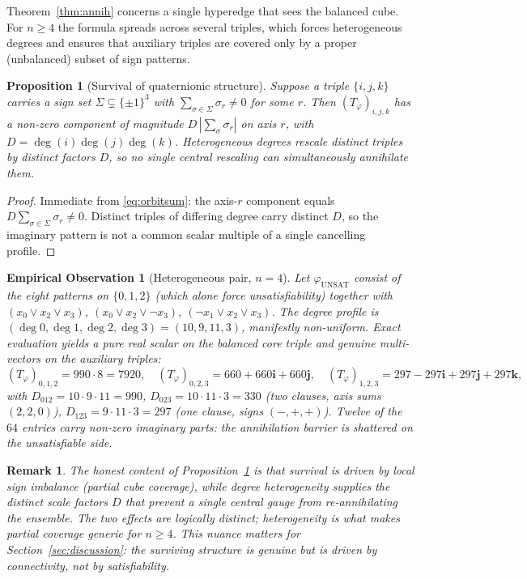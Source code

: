 \documentclass[pdflatex,sn-mathphys-num]{sn-jnl}
\theoremstyle{thmstyleone}%
\newtheorem{proposition}[theorem]{Proposition}%
\theoremstyle{thmstyletwo}%
\newtheorem{remark}{Remark}%
\newtheorem{observation}[theorem]{Empirical Observation}%
\theoremstyle{thmstylethree}%
\newcommand{\bi}{\mathbf{i}}
\newcommand{\bj}{\mathbf{j}}
\newcommand{\bk}{\mathbf{k}}
\newcommand{\Tphi}{T_{\varphi}}
\DeclareMathOperator{\deggr}{deg}
\begin{document}
Theorem~\ref{thm:annih} concerns a single hyperedge that sees the balanced
cube. For $n\ge4$ the formula spreads across several triples, which forces
heterogeneous degrees and ensures that auxiliary triples are covered only
by a proper (unbalanced) subset of sign patterns.

\begin{proposition}[Survival of quaternionic structure]\label{prop:survive}
Suppose a triple $\{i,j,k\}$ carries a sign set
$\Sigma\subsetneq\{\pm1\}^3$ with $\sum_{\sigma\in\Sigma}\sigma_r\neq0$ for
some $r$. Then $(\Tphi)_{i,j,k}$ has a non-zero component of magnitude
$D\,|\sum_\sigma\sigma_r|$ on axis $r$, with
$D=\deggr(i)\deggr(j)\deggr(k)$. Heterogeneous degrees rescale distinct
triples by distinct factors $D$, so no single central rescaling can
simultaneously annihilate them.
\end{proposition}

\begin{proof}
Immediate from \eqref{eq:orbitsum}: the axis-$r$ component equals
$D\sum_{\sigma\in\Sigma}\sigma_r\neq0$. Distinct triples of differing
degree carry distinct $D$, so the imaginary pattern is not a common scalar
multiple of a single cancelling profile.
\end{proof}

\begin{observation}[Heterogeneous pair, $n=4$]\label{obs:n4}
Let $\varphi_{\mathrm{UNSAT}}$ consist of the eight patterns on
$\{0,1,2\}$ (which alone force unsatisfiability) together with
$(x_0\vee x_2\vee x_3)$, $(x_0\vee x_2\vee\lnot x_3)$,
$(\lnot x_1\vee x_2\vee x_3)$. The degree profile is
$(\deggr0,\deggr1,\deggr2,\deggr3)=(10,9,11,3)$, manifestly non-uniform.
Exact evaluation yields a pure real scalar on the balanced core triple and
genuine multi-vectors on the auxiliary triples:
\[
  (\Tphi)_{0,1,2}=990\cdot8=7920,\quad
  (\Tphi)_{0,2,3}=660+660\bi+660\bj,\quad
  (\Tphi)_{1,2,3}=297-297\bi+297\bj+297\bk,
\]
with $D_{012}=10\cdot9\cdot11=990$, $D_{023}=10\cdot11\cdot3=330$ (two
clauses, axis sums $(2,2,0)$), $D_{123}=9\cdot11\cdot3=297$ (one clause,
signs $(-,+,+)$). Twelve of the $64$ entries carry non-zero imaginary
parts: the annihilation barrier is shattered on the unsatisfiable side.
\end{observation}

\begin{remark}\label{rem:honest}
The honest content of Proposition~\ref{prop:survive} is that survival is
driven by \emph{local sign imbalance} (partial cube coverage), while degree
heterogeneity supplies the distinct scale factors $D$ that prevent a single
central gauge from re-annihilating the ensemble. The two effects are
logically distinct; heterogeneity is what makes partial coverage generic
for $n\ge4$. This nuance matters for Section~\ref{sec:discussion}: the
surviving structure is genuine but is driven by connectivity, not by
satisfiability.
\end{remark}
\end{document}
